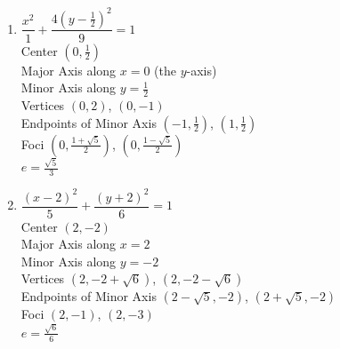 \documentclass{ximera}
\begin{document}
\begin{multicols}{2}
\begin{enumerate}
\setcounter{enumi}{\value{HW}}

\item  $\dfrac{x^2}{1} + \dfrac{4\left(y-\frac{1}{2}\right)^2}{9} = 1$\\
Center  $\left(0, \frac{1}{2} \right)$\\
Major Axis along $x=0$ (the $y$-axis)\\
Minor Axis along $y=\frac{1}{2}$\\
Vertices  $\left( 0, 2   \right)$, $(0, -1)$\\
Endpoints of Minor Axis $\left(-1, \frac{1}{2} \right)$, $\left(1, \frac{1}{2} \right)$\\
Foci $\left(0, \frac{1+\sqrt{5}}{2}\right)$, $\left(0, \frac{1-\sqrt{5}}{2}\right)$\\
$e = \frac{\sqrt{5}}{3}$

\vfill

\columnbreak


\item  $\dfrac{(x-2)^2}{5} + \dfrac{\left(y+2\right)^2}{6} = 1$\\
Center  $\left(2, -2 \right)$\\
Major Axis along $x=2$\\
Minor Axis along $y=-2$\\
Vertices  $\left( 2, -2+\sqrt{6}   \right)$, $(2, -2-\sqrt{6})$\\
Endpoints of Minor Axis $\left(2-\sqrt{5},-2 \right)$, $\left(2+\sqrt{5},-2\right)$\\
Foci $\left(2,-1 \right)$, $\left(2, -3\right)$\\
$e = \frac{\sqrt{6}}{6}$



\setcounter{HW}{\value{enumi}}
\end{enumerate}
\end{multicols}
\end{document}

